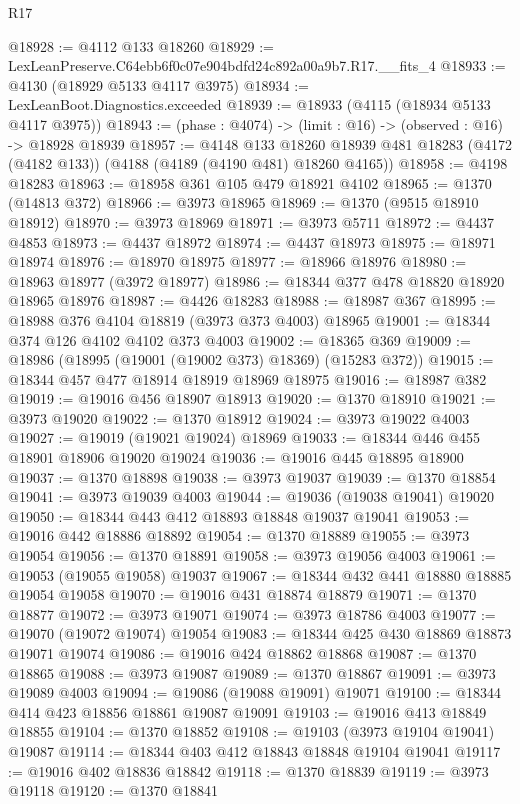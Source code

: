 \begin{lexlean}{R17}
\begin{coremodule}
@18928 := @4112 @133 @18260
@18929 := LexLeanPreserve.C64ebb6f0c07e904bdfd24c892a00a9b7.R17.__fits_4
@18933 := @4130 (@18929 @5133 @4117 @3975)
@18934 := LexLeanBoot.Diagnostics.exceeded
@18939 := @18933 (@4115 (@18934 @5133 @4117 @3975))
@18943 := (phase : @4074) -> (limit : @16) -> (observed : @16) -> @18928 @18939
@18957 := @4148
    @133
    @18260
    @18939
    @481
    @18283
    (@4172 (@4182 @133))
    (@4188 (@4189 (@4190 @481) @18260 @4165))
@18958 := @4198 @18283
@18963 := @18958 @361 @105 @479 @18921 @4102
@18965 := @1370 (@14813 @372)
@18966 := @3973 @18965
@18969 := @1370 (@9515 @18910 @18912)
@18970 := @3973 @18969
@18971 := @3973 @5711
@18972 := @4437 @4853
@18973 := @4437 @18972
@18974 := @4437 @18973
@18975 := @18971 @18974
@18976 := @18970 @18975
@18977 := @18966 @18976
@18980 := @18963 @18977 (@3972 @18977)
@18986 := @18344 @377 @478 @18820 @18920 @18965 @18976
@18987 := @4426 @18283
@18988 := @18987 @367
@18995 := @18988 @376 @4104 @18819 (@3973 @373 @4003) @18965
@19001 := @18344 @374 @126 @4102 @4102 @373 @4003
@19002 := @18365 @369
@19009 := @18986 (@18995 (@19001 (@19002 @373) @18369) (@15283 @372))
@19015 := @18344 @457 @477 @18914 @18919 @18969 @18975
@19016 := @18987 @382
@19019 := @19016 @456 @18907 @18913
@19020 := @1370 @18910
@19021 := @3973 @19020
@19022 := @1370 @18912
@19024 := @3973 @19022 @4003
@19027 := @19019 (@19021 @19024) @18969
@19033 := @18344 @446 @455 @18901 @18906 @19020 @19024
@19036 := @19016 @445 @18895 @18900
@19037 := @1370 @18898
@19038 := @3973 @19037
@19039 := @1370 @18854
@19041 := @3973 @19039 @4003
@19044 := @19036 (@19038 @19041) @19020
@19050 := @18344 @443 @412 @18893 @18848 @19037 @19041
@19053 := @19016 @442 @18886 @18892
@19054 := @1370 @18889
@19055 := @3973 @19054
@19056 := @1370 @18891
@19058 := @3973 @19056 @4003
@19061 := @19053 (@19055 @19058) @19037
@19067 := @18344 @432 @441 @18880 @18885 @19054 @19058
@19070 := @19016 @431 @18874 @18879
@19071 := @1370 @18877
@19072 := @3973 @19071
@19074 := @3973 @18786 @4003
@19077 := @19070 (@19072 @19074) @19054
@19083 := @18344 @425 @430 @18869 @18873 @19071 @19074
@19086 := @19016 @424 @18862 @18868
@19087 := @1370 @18865
@19088 := @3973 @19087
@19089 := @1370 @18867
@19091 := @3973 @19089 @4003
@19094 := @19086 (@19088 @19091) @19071
@19100 := @18344 @414 @423 @18856 @18861 @19087 @19091
@19103 := @19016 @413 @18849 @18855
@19104 := @1370 @18852
@19108 := @19103 (@3973 @19104 @19041) @19087
@19114 := @18344 @403 @412 @18843 @18848 @19104 @19041
@19117 := @19016 @402 @18836 @18842
@19118 := @1370 @18839
@19119 := @3973 @19118
@19120 := @1370 @18841

\end{coremodule}
\end{lexlean}
